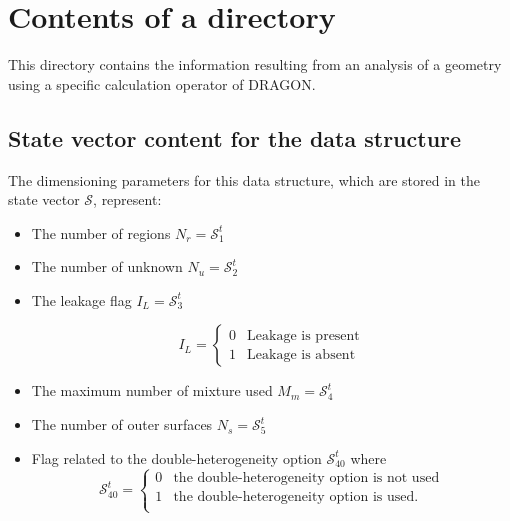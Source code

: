 \section{Contents of a  directory}\label{sect:trackingdir}

This directory contains the information resulting from an analysis of a geometry using a specific
calculation operator of DRAGON. 

\subsection{State vector content for the  data structure}\label{sect:trackingstate}

The dimensioning parameters for this data structure, which are stored in the state vector
$\mathcal{S}$, represent:

\begin{itemize}

\item The number of regions $N_{r}=\mathcal{S}^{t}_{1}$

\item The number of unknown $N_{u}=\mathcal{S}^{t}_{2}$

\item The leakage flag $I_{L}=\mathcal{S}^{t}_{3}$ 

\begin{displaymath}
I_{L} = \left\{
\begin{array}{rl}
 0 & \textrm{Leakage is present} \\
 1 & \textrm{Leakage is absent} 
\end{array} \right.
\end{displaymath}

\item The maximum number of mixture used $M_{m}=\mathcal{S}^{t}_{4}$

\item The number of outer surfaces $N_{s}=\mathcal{S}^{t}_{5}$

\item Flag related to the double-heterogeneity option $\mathcal{S}^{t}_{40}$ where
\begin{displaymath}
\mathcal{S}^{t}_{40} = \left\{
\begin{array}{rl}
 0 & \textrm{the double-heterogeneity option is not used} \\
 1 & \textrm{the double-heterogeneity option is used.} \\
\end{array} \right.
\end{displaymath}

\end{itemize}

